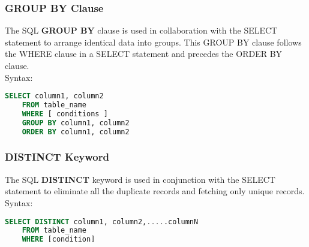  \subsubsection*{{GROUP BY Clause}}
 The SQL \textbf{GROUP BY} clause is used in collaboration with the SELECT statement to arrange identical data into groups. This GROUP BY clause follows the WHERE clause in a SELECT statement and precedes the ORDER BY clause.\\
 Syntax: 
 \begin{lstlisting}[language=SQL]
    SELECT column1, column2
    FROM table_name
    WHERE [ conditions ]
    GROUP BY column1, column2
    ORDER BY column1, column2
 \end{lstlisting}
 
 \subsubsection*{{DISTINCT Keyword}}
 The SQL \textbf{DISTINCT} keyword is used in conjunction with the SELECT statement to eliminate all the duplicate records and fetching only unique records.\\
 Syntax: 
 \begin{lstlisting}[language=SQL]
    SELECT DISTINCT column1, column2,.....columnN 
    FROM table_name
    WHERE [condition]
 \end{lstlisting}
 
 